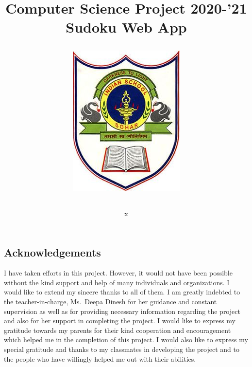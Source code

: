 \documentclass[12pt, a4paper]{report}
\title{
  \begin{huge}
    \textbf{
      {Computer Science Project 2020-'21}\\
      {Sudoku Web App}
    }\\
  \end{huge}
  \begin{figure}
      \centering
      {\includegraphics[scale=2]{iss}}
  \end{figure}
}
\author{
x %
}
\date{\vspace{-5ex}}
\begin{document}
  \begin{titlepage}
  \maketitle
  \end{titlepage}

  \newpage
  
  
  \newpage
  \maketitle
  \begin{large}
  \section*{Acknowledgements}
  I have taken efforts in this project. However, it would not have been possible without the kind support and help of many individuals and organizations. I would like to extend my sincere thanks to all of them. \newline
  \newline
  I am greatly indebted to the teacher-in-charge, Ms.~Deepa Dinesh for her guidance and constant supervision as well as for providing necessary information 
  regarding the project and also for her support in completing the project. \newline
  \newline
  I would like to express my gratitude towards my parents for their kind cooperation and encouragement which helped me in the completion of this project. \newline
  \newline
  I would also like to express my special gratitude and thanks to my classmates in developing the project and to the people who have willingly 
  helped me out with their abilities.
  \end{large}
  
  
  \maketitle    %
  \begin{large}
  \newpage
  \tableofcontents
  \end{large}
  
  
  \newpage
\end{document}
